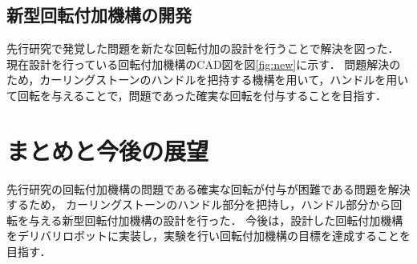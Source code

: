 \documentclass{classes/sice-si}
\begin{document}
\subsection{新型回転付加機構の開発}
先行研究で発覚した問題を新たな回転付加の設計を行うことで解決を図った．
現在設計を行っている回転付加機構のCAD図を図\ref{fig:new}に示す．
問題解決のため，カーリングストーンのハンドルを把持する機構を用いて，ハンドルを用いて回転を与えることで，問題であった確実な回転を付与することを目指す．


\section{まとめと今後の展望}
先行研究の回転付加機構の問題である確実な回転が付与が困難である問題を解決するため，
カーリングストーンのハンドル部分を把持し，ハンドル部分から回転を与える新型回転付加機構の設計を行った．
今後は，設計した回転付加機構をデリバリロボットに実装し，実験を行い回転付加機構の目標を達成することを目指す．



\printbibliography[title=参考文献]
\end{document}
